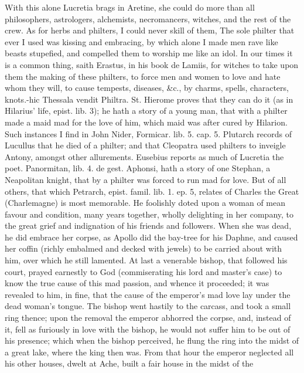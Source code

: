 {With this alone Lucretia brags in Aretine, she could do more than
all philosophers, astrologers, alchemists, necromancers, witches, and
the rest of the crew. As for herbs and philters, I could never skill of
them, The sole philter that ever I used was kissing and embracing, by
which alone I made men rave like beasts stupefied, and compelled them
to worship me like an idol. In our times it is a common thing, saith
Erastus, in his book de Lamiis, for witches to take upon them the
making of these philters, to force men and women to love and hate
whom they will, to cause tempests, diseases, \&c., by charms, spells,
characters, knots.-hic Thessala vendit Philtra. St. Hierome
proves that they can do it (as in Hilarius' life, epist. lib. 3); he
hath a story of a young man, that with a philter made a maid mad for
the love of him, which maid was after cured by Hilarion. Such instances
I find in John Nider, Formicar. lib. 5. cap. 5. Plutarch records of
Lucullus that he died of a philter; and that Cleopatra used philters to
inveigle Antony, amongst other allurements. Eusebius reports as much of
Lucretia the poet. Panormitan, lib. 4. de gest. Aphonsi, hath a story
of one Stephan, a Neapolitan knight, that by a philter was forced to
run mad for love. But of all others, that which Petrarch, epist.
famil. lib. 1. ep. 5, relates of Charles the Great (Charlemagne) is
most memorable. He foolishly doted upon a woman of mean favour and
condition, many years together, wholly delighting in her company, to
the great grief and indignation of his friends and followers. When she
was dead, he did embrace her corpse, as Apollo did the bay-tree for his
Daphne, and caused her coffin (richly embalmed and decked with jewels)
to be carried about with him, over which he still lamented. At last a
venerable bishop, that followed his court, prayed earnestly to God
(commiserating his lord and master's case) to know the true cause of
this mad passion, and whence it proceeded; it was revealed to him, in
fine, that the cause of the emperor's mad love lay under the dead
woman's tongue. The bishop went hastily to the carcass, and took a
small ring thence; upon the removal the emperor abhorred the corpse,
and, instead of it, fell as furiously in love with the bishop, he
would not suffer him to be out of his presence; which when the bishop
perceived, he flung the ring into the midst of a great lake, where the
king then was. From that hour the emperor neglected all his other
houses, dwelt at Ache, built a fair house in the midst of the
}
